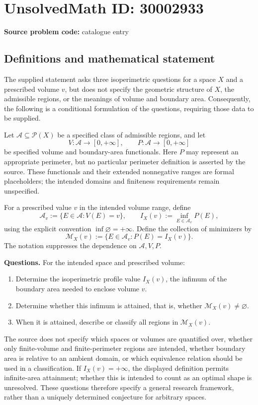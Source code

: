 \documentclass[11pt]{article}
\begin{document}
\section*{UnsolvedMath ID: 30002933}
\textbf{Source problem code:} catalogue entry
\subsection{Definitions and mathematical statement}
The supplied statement asks three isoperimetric questions for a space \(X\) and a prescribed volume \(v\), but does not specify the geometric structure of \(X\), the admissible regions, or the meanings of volume and boundary area. Consequently, the following is a conditional formulation of the questions, requiring those data to be supplied.

Let \(\mathcal A\subseteq\mathcal P(X)\) be a specified class of admissible regions, and let
\[
V:\mathcal A\longrightarrow[0,+\infty],\qquad
P:\mathcal A\longrightarrow[0,+\infty]
\]
be specified volume and boundary-area functionals. Here \(P\) may represent an appropriate perimeter, but no particular perimeter definition is asserted by the source. These functionals and their extended nonnegative ranges are formal placeholders; the intended domains and finiteness requirements remain unspecified.

For a prescribed value \(v\) in the intended volume range, define
\[
\mathcal A_v:=\{E\in\mathcal A:V(E)=v\},\qquad
I_X(v):=\inf_{E\in\mathcal A_v}P(E),
\]
using the explicit convention \(\inf\varnothing=+\infty\). Define the collection of minimizers by
\[
\mathcal M_X(v):=
\{E\in\mathcal A_v:P(E)=I_X(v)\}.
\]
The notation suppresses the dependence on \(\mathcal A,V,P\).

\textbf{Questions.} For the intended space and prescribed volume:
\begin{enumerate}
\item Determine the isoperimetric profile value \(I_X(v)\), the infimum of the boundary area needed to enclose volume \(v\).
\item Determine whether this infimum is attained, that is, whether \(\mathcal M_X(v)\ne\varnothing\).
\item When it is attained, describe or classify all regions in \(\mathcal M_X(v)\).
\end{enumerate}
The source does not specify which spaces or volumes are quantified over, whether only finite-volume and finite-perimeter regions are intended, whether boundary area is relative to an ambient domain, or which equivalence relation should be used in a classification. If \(I_X(v)=+\infty\), the displayed definition permits infinite-area attainment; whether this is intended to count as an optimal shape is unresolved. These questions therefore specify a general research framework, rather than a uniquely determined conjecture for arbitrary spaces.
\end{document}

